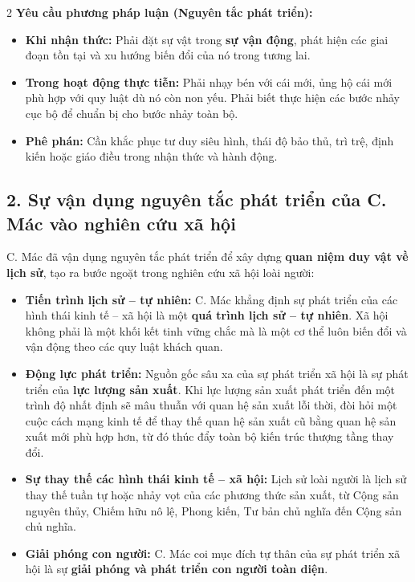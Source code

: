 \documentclass[9pt,a4paper]{extarticle}
\begin{document}
\begin{multicols*}{2}
\textbf{Yêu cầu phương pháp luận (Nguyên tắc phát triển):}

\begin{itemize}
\item \textbf{Khi nhận thức:} Phải đặt sự vật trong \textbf{sự vận động}, phát hiện các giai đoạn tồn tại và xu hướng biến đổi của nó trong tương lai.
\item \textbf{Trong hoạt động thực tiễn:} Phải nhạy bén với cái mới, ủng hộ cái mới phù hợp với quy luật dù nó còn non yếu. Phải biết thực hiện các bước nhảy cục bộ để chuẩn bị cho bước nhảy toàn bộ.
\item \textbf{Phê phán:} Cần khắc phục tư duy siêu hình, thái độ bảo thủ, trì trệ, định kiến hoặc giáo điều trong nhận thức và hành động.
\end{itemize}

\subsection*{2. Sự vận dụng nguyên tắc phát triển của C. Mác vào nghiên cứu xã hội}

C. Mác đã vận dụng nguyên tắc phát triển để xây dựng \textbf{quan niệm duy vật về lịch sử}, tạo ra bước ngoặt trong nghiên cứu xã hội loài người:

\begin{itemize}
\item \textbf{Tiến trình lịch sử -- tự nhiên:} C. Mác khẳng định sự phát triển của các hình thái kinh tế -- xã hội là một \textbf{quá trình lịch sử -- tự nhiên}. Xã hội không phải là một khối kết tinh vững chắc mà là một cơ thể luôn biến đổi và vận động theo các quy luật khách quan.
\item \textbf{Động lực phát triển:} Nguồn gốc sâu xa của sự phát triển xã hội là sự phát triển của \textbf{lực lượng sản xuất}. Khi lực lượng sản xuất phát triển đến một trình độ nhất định sẽ mâu thuẫn với quan hệ sản xuất lỗi thời, đòi hỏi một cuộc cách mạng kinh tế để thay thế quan hệ sản xuất cũ bằng quan hệ sản xuất mới phù hợp hơn, từ đó thúc đẩy toàn bộ kiến trúc thượng tầng thay đổi.
\item \textbf{Sự thay thế các hình thái kinh tế -- xã hội:} Lịch sử loài người là lịch sử thay thế tuần tự hoặc nhảy vọt của các phương thức sản xuất, từ Cộng sản nguyên thủy, Chiếm hữu nô lệ, Phong kiến, Tư bản chủ nghĩa đến Cộng sản chủ nghĩa.
\item \textbf{Giải phóng con người:} C. Mác coi mục đích tự thân của sự phát triển xã hội là sự \textbf{giải phóng và phát triển con người toàn diện}.
\end{itemize}


\end{multicols*}
\end{document}
